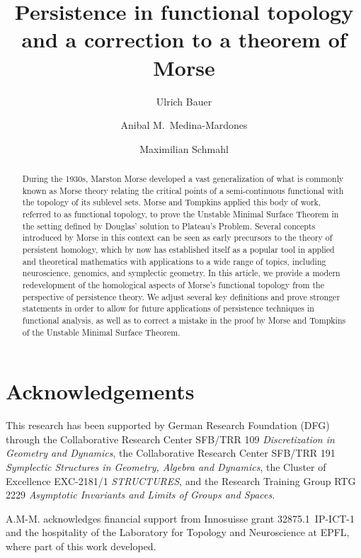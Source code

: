 \documentclass[nospthms, a4paper, final]{svjour3}
\theoremstyle{plain}
\theoremstyle{definition}
\begin{document}
\title{Persistence in functional topology and a correction to a theorem of Morse}

\author{Ulrich Bauer \and Anibal M.~Medina-Mardones \and Maximilian Schmahl}



\maketitle

\begin{abstract}
	During the 1930s, Marston Morse developed a vast generalization of what is commonly known as Morse theory relating the critical points of a semi-continuous functional with the topology of its sublevel sets.
	Morse and Tompkins applied this body of work, referred to as functional topology, to prove the Unstable Minimal Surface Theorem in the setting defined by Douglas' solution to Plateau's Problem.
	Several concepts introduced by Morse in this context can be seen as early precursors to the theory of persistent homology, which by now has established itself as a popular tool in applied and theoretical mathematics with applications to a wide range of topics, including neuroscience, genomics, and symplectic geometry.
	In this article, we provide a modern redevelopment of the homological aspects of Morse's functional topology from the perspective of persistence theory.
	We adjust several key definitions and prove stronger statements in order to allow for future applications of persistence techniques in functional analysis, as well as to correct a mistake in the proof by Morse and Tompkins of the Unstable Minimal Surface Theorem.
\end{abstract}

\tableofcontents





\appendix


\section*{Acknowledgements}
This research has been supported by German Research Foundation (DFG) through the Collaborative Research Center SFB/TRR 109 \emph{Discretization in Geometry and Dynamics}, the Collaborative Research Center SFB/TRR 191 \emph{Symplectic Structures in Geometry, Algebra and Dynamics}, the Cluster of Excellence EXC-2181/1 \emph{STRUCTURES}, and the Research Training Group RTG 2229 \emph{Asymptotic Invariants and Limits of Groups and Spaces}.

A.M-M. acknowledges financial support from Innosuisse grant \mbox{32875.1 IP-ICT-1} and the hospitality of the Laboratory for Topology and Neuroscience at EPFL, where part of this work developed.



\end{document}

